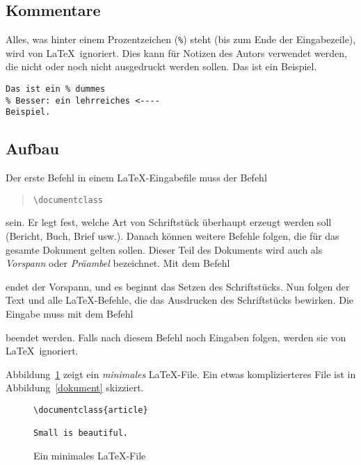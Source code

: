 \subsection{Kommentare}
 
Alles, was hinter einem Prozentzeichen (\verb|%|)
steht (bis zum Ende der Eingabezeile), wird von \LaTeX\ 
ignoriert.
Dies kann für Notizen des Autors verwendet werden, die nicht
oder noch nicht ausgedruckt werden sollen.
\exa
Das ist ein %
Beispiel.
\exb
\begin{verbatim}
Das ist ein % dummes
% Besser: ein lehrreiches <----
Beispiel.
\end{verbatim}
\exc
 
\subsection{Aufbau}
 
Der erste Befehl in einem \LaTeX-Eingabefile muss der Befehl
\begin{quote}
\verb|\documentclass|
\end{quote}
sein.
Er legt fest, welche Art von Schriftstück überhaupt erzeugt werden soll
(Bericht, Buch, Brief usw.).
Danach können weitere Befehle folgen, die für das gesamte
Dokument gelten sollen.  Dieser Teil des Dokuments wird auch als 
\emph{Vorspann} oder \emph{Präambel} bezeichnet.  Mit dem Befehl
\begin{quote}
\verb||
\end{quote}
endet der Vorspann, und es 
beginnt das Setzen des Schriftstücks.
Nun folgen der Text und alle \LaTeX-Befehle, die das Ausdrucken
des Schriftstücks bewirken.
Die Eingabe muss mit dem Befehl
\begin{quote}
\verb||
\end{quote}
beendet werden.
Falls nach diesem Befehl noch Eingaben folgen, werden sie von
\LaTeX\ ignoriert.
 
Abbildung~\ref{mini} zeigt ein \emph{minimales} \LaTeX-File.
Ein etwas komplizierteres File ist in Abbildung~\ref{dokument}
skizziert.
 
\begin{figure}[hbp] %
\oben{6cm}
\begin{verbatim}
\documentclass{article}

Small is beautiful.

\end{verbatim}
\unten
\caption{Ein minimales \LaTeX-File} \label{mini}
\end{figure}

